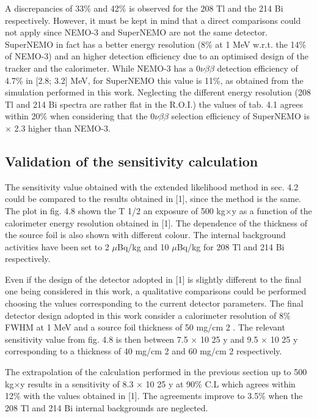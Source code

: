 \documentclass[main.tex]{subfiles}
\begin{document}
\NI A discrepancies of 33\% and 42\% is observed for the 208 Tl and the 214 Bi respectively. However, it must be kept in mind that a direct comparisons could not apply since NEMO-3 and SuperNEMO are not the same detector. SuperNEMO in fact has a better energy resolution (8\% at 1 MeV w.r.t. the 14\% of NEMO-3) and an higher detection efficiency due to an optimised design of the tracker and the calorimeter. While NEMO-3 has a 0$\nu\beta\beta$ detection efficiency of 4.7\% in [2.8; 3.2] MeV, for SuperNEMO this value is 11\%, as obtained from the simulation performed in this work. Neglecting the different energy resolution (208 Tl and 214 Bi spectra are rather flat in the R.O.I.) the values of tab. 4.1 agrees within 20\% when considering that the 0$\nu\beta\beta$ selection efficiency of SuperNEMO is $\times$ 2.3 higher than NEMO-3.


\subsection{Validation of the sensitivity calculation}


\NI The sensitivity value obtained with the extended likelihood method in sec. 4.2 could be compared to the results obtained in [1], since the method is the same. The plot in fig. 4.8 shown the T 1/2 an exposure of 500 kg$\times$y as a function of the calorimeter energy resolution obtained in [1]. The dependence of the thickness of the source foil is also shown with different colour. The internal background activities have been set to 2 $\mu$Bq/kg and 10 $\mu$Bq/kg for 208 Tl and 214 Bi respectively.


\bigskip


\NI Even if the design of the detector adopted in [1] is slightly different to the final one being considered in this work, a qualitative comparisons could be performed choosing the values corresponding to the current detector parameters. The final detector design adopted in this work consider a calorimeter resolution of 8\% FWHM at 1 MeV and a source foil thickness of 50 mg/cm 2 . The relevant sensitivity value from fig. 4.8 is then between 7.5 $\times$ 10 25 y and 9.5 $\times$ 10 25 y corresponding to a thickness of 40 mg/cm 2 and 60 mg/cm 2 respectively.


\bigskip


\NI The extrapolation of the calculation performed in the previous section up to 500 kg$\times$y results in a sensitivity of 8.3 $\times$ 10 25 y at 90\% C.L which agrees within 12\% with the values obtained in [1]. The agreements improve to 3.5\% when the 208 Tl and 214 Bi internal backgrounds are neglected.
\end{document}

